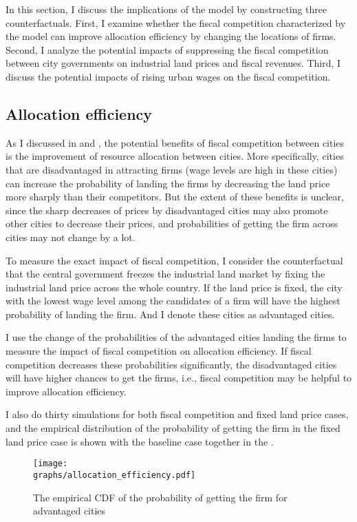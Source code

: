 In this section, I discuss the implications of the model by constructing three counterfactuals.
First,
I examine whether the fiscal competition characterized by the model can improve
allocation efficiency by changing the locations of firms. Second, I analyze the potential impacts
of suppressing the fiscal competition between city governments on industrial land prices and fiscal
revenues. Third, I discuss the potential impacts of rising urban wages on the fiscal competition.

\subsection{Allocation efficiency}
As I discussed in  and , the potential benefits
of fiscal competition between cities is the improvement of resource allocation between cities.
More specifically, cities that are disadvantaged in attracting firms (wage levels are high
in these cities) can increase the probability of landing the firms by decreasing the land price more
sharply than their competitors. But the extent of these benefits is unclear, since the sharp decreases
of prices by disadvantaged cities may also promote other cities to decrease their prices,
and probabilities of getting
the firm across cities may not change by a lot.

To measure the exact impact of fiscal competition, I consider the counterfactual that the
central government freezes the industrial land market by fixing the industrial land price
across the whole country. If the land price is fixed,
the city with the lowest wage level
among the candidates of a firm
will have the highest probability of landing the firm.
And I denote these cities as advantaged cities.

I use the change of the probabilities of the advantaged cities landing the firms
to measure the impact of fiscal competition on allocation efficiency.
If fiscal competition decreases these probabilities significantly,
the disadvantaged cities will have higher chances to get the firms,
i.e., fiscal competition may be helpful to improve allocation efficiency.

I also do thirty simulations for both fiscal competition and fixed land price cases, and
the empirical distribution of the probability of getting the firm in the fixed land price case is shown
with the baseline case together
in the .
\begin{figure}[H]
    \centering
    \caption{The empirical CDF of the probability of getting the firm for advantaged cities}
    \texttt{[image: \\graphs/allocation\_efficiency.pdf]}
    \label{fig: allocation efficiency}
\end{figure}

